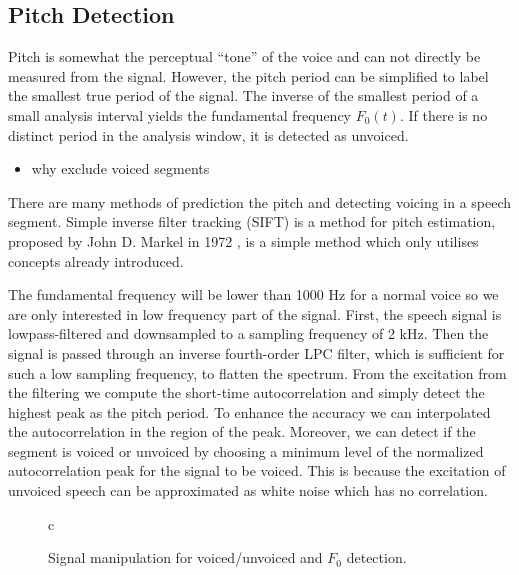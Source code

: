 \subsection{Pitch Detection} %
\label{sub:pitch_detection}
Pitch is somewhat the perceptual ``tone'' of the voice and can not directly be measured from the signal. However, the pitch period can be simplified to label the smallest true period of the signal. The inverse of the smallest period of a small analysis interval yields the fundamental frequency $F_0(t)$. If there is no distinct period in the analysis window, it is detected as unvoiced.
\begin{itemize}
	\item why exclude voiced segments
\end{itemize}
There are many methods of prediction the pitch and detecting voicing in a speech segment. Simple inverse filter tracking (SIFT) is a method for pitch estimation, proposed by John D. Markel in 1972 \cite{markel72}, is a simple method which only utilises concepts already introduced. 

The fundamental frequency will be lower than 1000 Hz for a normal voice so we are only interested in low frequency part of the signal. First, the speech signal is lowpass-filtered and downsampled to a sampling frequency of 2 kHz. Then the signal is passed through an inverse fourth-order LPC filter, which is sufficient for such a low sampling frequency, to flatten the spectrum. From the excitation from the filtering we compute the short-time autocorrelation and simply detect the highest peak as the pitch period. To enhance the accuracy we can interpolated the autocorrelation in the region of the peak. Moreover, we can detect if the segment is voiced or unvoiced by choosing a minimum level of the normalized autocorrelation peak for the signal to be voiced. This is because the excitation of unvoiced speech can be approximated as white noise which has no correlation.
\begin{figure}[htbp]
  \centering
  \begin{tabular}[h]{c}
  \end{tabular}
  \caption{Signal manipulation for voiced/unvoiced and $F_0$ detection.}
  \label{fig:mfcc}
\end{figure}




